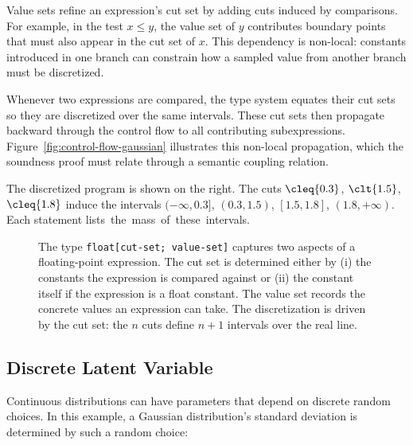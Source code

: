 \noindent Value sets refine an expression's cut set by adding cuts induced by comparisons. For example, in the test $x \leq y$, the value set of $y$ contributes boundary points that must also appear in the cut set of $x$. This dependency is non-local: constants introduced in one branch can constrain how a sampled value from another branch must be discretized.

Whenever two expressions are compared, the type system equates their cut sets so they are discretized over the same intervals. These cut sets then propagate backward through the control flow to all contributing subexpressions. Figure~\ref{fig:control-flow-gaussian} illustrates this non-local propagation, which the soundness proof must relate through a semantic coupling relation.

\noindent The discretized program is shown on the right. The cuts $\cleq{0.3}$, $\clt{1.5}$, $\cleq{1.8}$ induce the intervals $(-\infty, 0.3]$, $(0.3, 1.5)$, $[1.5, 1.8]$, $(1.8, +\infty)$. Each \discrete{} statement \mbox{lists the mass of these intervals.}

\begin{figure}
    \caption{The type \lstinline{float[cut-set; value-set]} captures two aspects of a floating-point expression. The cut set is determined either by (i) the constants the expression is compared against or (ii) the constant itself if the expression is a float constant. The value set records the concrete values an expression can take. The discretization is driven by the cut set: the $n$ cuts define $n+1$ intervals over the real line.}
    \label{fig:float-type-def}
\end{figure}

\subsection{Discrete Latent Variable}\label{sec:examples:5}

Continuous distributions can have parameters that depend on discrete random choices. In this example, a Gaussian distribution's standard deviation is determined by such a random choice:

